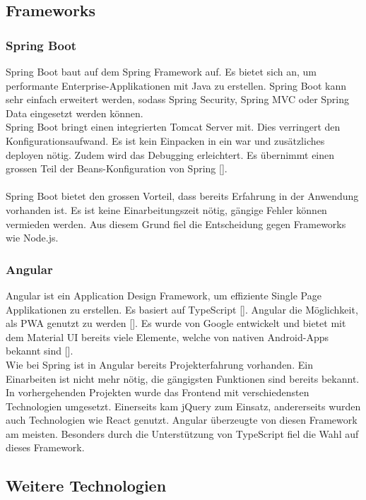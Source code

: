 \subsection{Frameworks}
\subsubsection{\gls{Spring Boot}}
Spring Boot baut auf dem \gls{Spring} Framework auf. Es bietet sich an, um performante Enterprise-Applikationen mit Java zu erstellen. Spring Boot kann sehr einfach erweitert werden, sodass Spring Security, Spring MVC oder Spring Data eingesetzt werden können.\\
Spring Boot bringt einen integrierten Tomcat Server mit. Dies verringert den Konfigurationsaufwand. Es ist kein Einpacken in ein \gls{war} und zusätzliches deployen nötig. Zudem wird das Debugging erleichtert. Es übernimmt einen grossen Teil der Beans-Konfiguration von Spring [\cite{springBoot}].\\\\
Spring Boot bietet den grossen Vorteil, dass bereits Erfahrung in der Anwendung vorhanden ist. Es ist keine Einarbeitungszeit nötig, gängige Fehler können vermieden werden. Aus diesem Grund fiel die Entscheidung gegen Frameworks wie Node.js. 

\subsubsection{\gls{Angular}}\label{angularLabel}
Angular ist ein Application Design Framework, um effiziente Single Page Applikationen zu erstellen. Es basiert auf TypeScript [\cite{angular}]. Angular die Möglichkeit, als \gls{PWA} genutzt zu werden [\cite{angularPWA}]. 
Es wurde von Google entwickelt und bietet mit dem Material UI bereits viele Elemente, welche von nativen Android-Apps bekannt sind [\cite{angularMaterialUI}]. \\
Wie bei Spring ist in Angular bereits Projekterfahrung vorhanden. Ein Einarbeiten ist nicht mehr nötig, die gängigsten Funktionen sind bereits bekannt. \\
In vorhergehenden Projekten wurde das Frontend mit verschiedensten Technologien umgesetzt. Einerseits kam jQuery zum Einsatz, andererseits wurden auch Technologien wie \gls{React} genutzt. \gls{Angular} überzeugte von diesen Framework am meisten. Besonders durch die Unterstützung von \gls{TypeScript} fiel die Wahl auf dieses Framework. 
\newpage
\subsection{Weitere Technologien}
